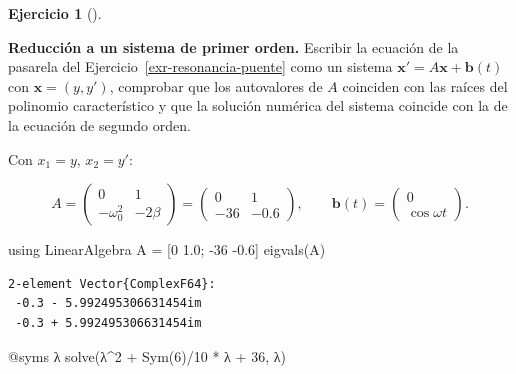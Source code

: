 \documentclass[
  spanish,
  a4paper,
]{scrreport}
\newenvironment{Shaded}{\begin{snugshade}}{\end{snugshade}}
\newcommand{\BuiltInTok}[1]{\textcolor[rgb]{0.00,0.23,0.31}{#1}}
\newcommand{\FloatTok}[1]{\textcolor[rgb]{0.68,0.00,0.00}{#1}}
\newcommand{\FunctionTok}[1]{\textcolor[rgb]{0.28,0.35,0.67}{#1}}
\newcommand{\ImportTok}[1]{\textcolor[rgb]{0.00,0.46,0.62}{#1}}
\newcommand{\NormalTok}[1]{\textcolor[rgb]{0.00,0.23,0.31}{#1}}
\newcommand{\OperatorTok}[1]{\textcolor[rgb]{0.37,0.37,0.37}{#1}}
\newcommand{\PreprocessorTok}[1]{\textcolor[rgb]{0.68,0.00,0.00}{#1}}
\theoremstyle{definition}
\newtheorem{exercise}{Ejercicio}[chapter]
\theoremstyle{remark}
\begin{document}
\begin{exercise}[]\protect\hypertarget{exr-orden-superior-sistema}{}\label{exr-orden-superior-sistema}

\textbf{Reducción a un sistema de primer orden.} Escribir la ecuación de
la pasarela del Ejercicio~\ref{exr-resonancia-puente} como un sistema
\(\mathbf{x}'=A\mathbf{x}+\mathbf{b}(t)\) con \(\mathbf{x}=(y, y')\),
comprobar que los autovalores de \(A\) coinciden con las raíces del
polinomio característico y que la solución numérica del sistema coincide
con la de la ecuación de segundo orden.

\begin{tcolorbox}[enhanced jigsaw, arc=.35mm, bottomrule=.15mm, bottomtitle=1mm, breakable, colback=white, colbacktitle=quarto-callout-tip-color!10!white, colframe=quarto-callout-tip-color-frame, coltitle=black, left=2mm, leftrule=.75mm, opacityback=0, opacitybacktitle=0.6, rightrule=.15mm, title=\textcolor{quarto-callout-tip-color}{\faLightbulb}\hspace{0.5em}{Solución}, titlerule=0mm, toprule=.15mm, toptitle=1mm]

Con \(x_1=y\), \(x_2=y'\):

\[
A = \begin{pmatrix} 0 & 1 \\ -\omega_0^2 & -2\beta \end{pmatrix}
  = \begin{pmatrix} 0 & 1 \\ -36 & -0.6 \end{pmatrix},
\qquad \mathbf{b}(t) = \begin{pmatrix} 0 \\ \cos\omega t\end{pmatrix}.
\]

\begin{Shaded}
\begin{Highlighting}[]
\ImportTok{using} \BuiltInTok{LinearAlgebra}
\NormalTok{A }\OperatorTok{=}\NormalTok{ [}\FloatTok{0} \FloatTok{1.0}\NormalTok{; }\OperatorTok{{-}}\FloatTok{36} \OperatorTok{{-}}\FloatTok{0.6}\NormalTok{]}
\FunctionTok{eigvals}\NormalTok{(A)}
\end{Highlighting}
\end{Shaded}

\begin{verbatim}
2-element Vector{ComplexF64}:
 -0.3 - 5.992495306631454im
 -0.3 + 5.992495306631454im
\end{verbatim}

\begin{Shaded}
\begin{Highlighting}[]
\PreprocessorTok{@syms}\NormalTok{ λ}
\FunctionTok{solve}\NormalTok{(λ}\OperatorTok{\^{}}\FloatTok{2} \OperatorTok{+} \FunctionTok{Sym}\NormalTok{(}\FloatTok{6}\NormalTok{)}\OperatorTok{/}\FloatTok{10} \OperatorTok{*}\NormalTok{ λ }\OperatorTok{+} \FloatTok{36}\NormalTok{, λ)}
\end{Highlighting}
\end{Shaded}


\end{tcolorbox}
\end{exercise}
\end{document}
